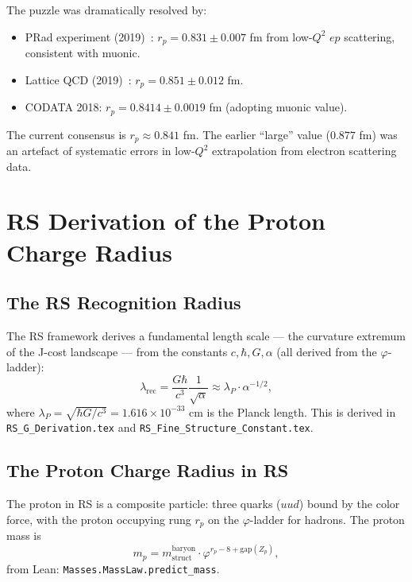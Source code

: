 \documentclass[12pt,a4paper]{article}
\theoremstyle{definition}
\theoremstyle{remark}
\begin{document}
The puzzle was dramatically resolved by:
\begin{itemize}
  \item PRad experiment (2019)~\cite{Xiong2019}: $r_p = 0.831 \pm
        0.007$ fm from low-$Q^2$ $ep$ scattering, consistent with muonic.
  \item Lattice QCD (2019)~\cite{Borsanyi2020}: $r_p = 0.851 \pm 0.012$ fm.
  \item CODATA 2018: $r_p = 0.8414 \pm 0.0019$ fm (adopting muonic value).
\end{itemize}

The current consensus is $r_p \approx 0.841$ fm.  The earlier ``large''
value ($0.877$ fm) was an artefact of systematic errors in low-$Q^2$
extrapolation from electron scattering data.

\section{RS Derivation of the Proton Charge Radius}
\label{sec:derivation}

\subsection{The RS Recognition Radius}

The RS framework derives a fundamental length scale — the curvature
extremum of the J-cost landscape — from the constants $c, \hbar, G,
\alpha$ (all derived from the $\varphi$-ladder):
\begin{equation}
  \lambda_\mathrm{rec} = \frac{G\hbar}{c^3}\frac{1}{\sqrt{\alpha}}
  \approx \lambda_P \cdot \alpha^{-1/2},
  \label{eq:lambda_rec}
\end{equation}
where $\lambda_P = \sqrt{\hbar G/c^3} = 1.616 \times 10^{-33}$ cm is
the Planck length.  This is derived in
\texttt{RS\_G\_Derivation.tex} and \texttt{RS\_Fine\_Structure\_Constant.tex}.

\subsection{The Proton Charge Radius in RS}

The proton in RS is a composite particle: three quarks ($uud$) bound
by the color force, with the proton occupying rung $r_p$ on the
$\varphi$-ladder for hadrons.  The proton mass is
\begin{equation}
  m_p = m_\mathrm{struct}^\mathrm{baryon} \cdot
  \varphi^{r_p - 8 + \mathrm{gap}(Z_p)},
  \label{eq:mp}
\end{equation}
from Lean: \texttt{Masses.MassLaw.predict\_mass}.
\end{document}
